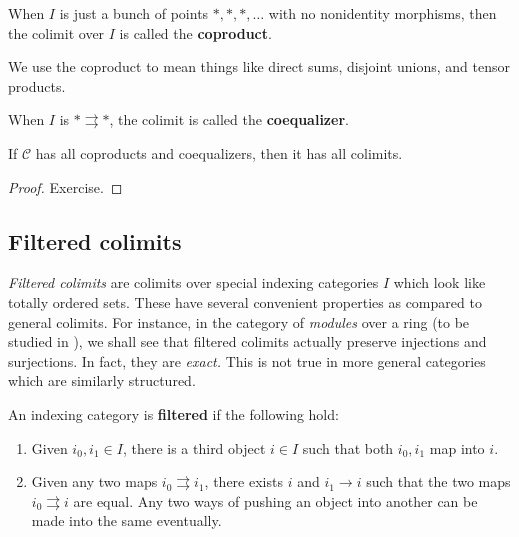\begin{definition}
When $I$ is just a bunch of points  $\ast, \ast, \ast, \dots$ with no
nonidentity morphisms, then the
colimit over $I$ is called the \textbf{coproduct}.
\end{definition}

We use the coproduct to mean things like direct sums, disjoint unions, and
tensor products.

\begin{definition}
When $I$ is $\ast \rightrightarrows \ast$, the colimit is called the
\textbf{coequalizer}.
\end{definition}

\begin{theorem}
If $\mathcal{C}$ has all coproducts and coequalizers, then it has all colimits.
\end{theorem}

\begin{proof}
Exercise.  \end{proof}

\subsection{Filtered colimits}


\emph{Filtered colimits} are colimits
over special indexing categories $I$ which look like totally ordered sets.
These have several convenient properties as compared to general colimits.
For instance, in the category of \emph{modules} over a ring (to be studied in
), we shall see that filtered colimits actually
preserve injections and surjections. In fact, they are \emph{exact.} This is
not true in more general categories which are similarly structured.



\begin{definition}
An indexing category is \textbf{filtered} if the following hold:
\begin{enumerate}
\item Given $i_0, i_1 \in I$, there is a third object $i \in I$ such that both
$i_0, i_1$ map into $i$.
\item Given any two maps $i_0 \rightrightarrows i_1$, there exists $i$ and $i_1
\to i$ such that the two maps $i_0 \rightrightarrows i$ are equal. Any two ways
of pushing an object into another can be made into the same eventually.
\end{enumerate}
\end{definition}

